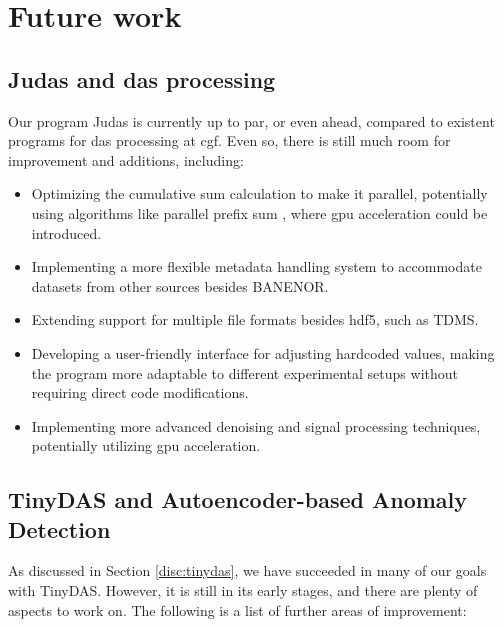 \section{Future work}
\label{conc:further}

\subsection{Judas and \acrshort{das} processing}

Our program Judas is currently up to par, or even ahead, compared to existent programs for \acrshort{das} processing at \acrshort{cgf}. Even so, there is still much room for improvement and additions, including:

\begin{itemize}
    \item Optimizing the cumulative sum calculation to make it parallel, potentially using algorithms like parallel prefix sum \cite{harris2007parallel}, where \acrshort{gpu} acceleration could be introduced.
    \item Implementing a more flexible metadata handling system to accommodate datasets from other sources besides BANENOR.
    \item Extending support for multiple file formats besides \acrshort{hdf5}, such as TDMS.
    \item Developing a user-friendly interface for adjusting hardcoded values, making the program more adaptable to different experimental setups without requiring direct code modifications.
    \item Implementing more advanced denoising and signal processing techniques, potentially utilizing \acrshort{gpu} acceleration.
\end{itemize}

\subsection{TinyDAS and Autoencoder-based Anomaly Detection}

As discussed in Section \ref{disc:tinydas}, we have succeeded in many of our goals with TinyDAS. However, it is still in its early stages, and there are plenty of aspects to work on. The following is a list of further areas of improvement:

